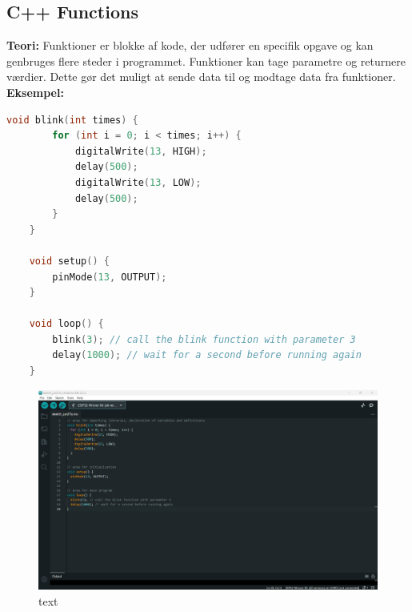 \subsection{C++ Functions}
\textbf{Teori:} Funktioner er blokke af kode, der udfører en specifik opgave og kan genbruges flere steder i programmet. Funktioner kan tage parametre og returnere værdier. Dette gør det muligt at sende data til og modtage data fra funktioner.
\newline\newline
\noindent\textbf{Eksempel:}
\begin{lstlisting}[language=C++]
	void blink(int times) {
		for (int i = 0; i < times; i++) {
			digitalWrite(13, HIGH);
			delay(500);
			digitalWrite(13, LOW);
			delay(500);
		}
	}
	
	void setup() {
		pinMode(13, OUTPUT);
	}
	
	void loop() {
		blink(3); // call the blink function with parameter 3
		delay(1000); // wait for a second before running again
	}
\end{lstlisting}
\begin{figure}[h!]
	\centering
	\includegraphics[width=\textwidth]{fig/fig11.png}
	\caption{text}
	\label{fig:11}
\end{figure}

